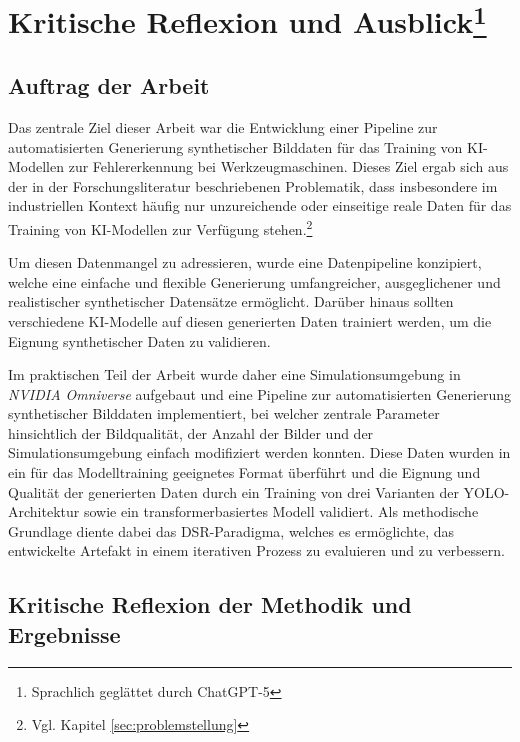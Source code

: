 \chapter[Kritische Reflexion und Ausblick]{Kritische Reflexion und Ausblick\footnote{Sprachlich geglättet durch ChatGPT-5}}
\label{chapter:Ergebnisdiskussion}

\section{Auftrag der Arbeit}
Das zentrale Ziel dieser Arbeit war die Entwicklung einer Pipeline zur automatisierten Generierung synthetischer Bilddaten für das Training von \ac{KI}-Modellen zur Fehlererkennung bei Werkzeugmaschinen. Dieses Ziel ergab sich aus der in der Forschungsliteratur beschriebenen Problematik, dass insbesondere im industriellen Kontext häufig nur unzureichende oder einseitige reale Daten für das Training von \ac{KI}-Modellen zur Verfügung stehen.\footnote{Vgl. Kapitel \ref{sec:problemstellung}}

Um diesen Datenmangel zu adressieren, wurde eine Datenpipeline konzipiert, welche eine einfache und flexible Generierung umfangreicher, ausgeglichener und realistischer synthetischer Datensätze ermöglicht. Darüber hinaus sollten verschiedene \ac{KI}-Modelle auf diesen generierten Daten trainiert werden, um die Eignung synthetischer Daten zu validieren.

Im praktischen Teil der Arbeit wurde daher eine Simulationsumgebung in \textit{NVIDIA Omniverse} aufgebaut und eine Pipeline zur automatisierten Generierung synthetischer Bilddaten implementiert, bei welcher zentrale Parameter hinsichtlich der Bildqualität, der Anzahl der Bilder und der Simulationsumgebung einfach modifiziert werden konnten. Diese Daten wurden in ein für das Modelltraining geeignetes Format überführt und die Eignung und Qualität der generierten Daten durch ein Training von drei Varianten der \ac{YOLO}-Architektur sowie ein transformerbasiertes Modell validiert. Als methodische Grundlage diente dabei das \ac{DSR}-Paradigma, welches es ermöglichte, das entwickelte Artefakt in einem iterativen Prozess zu evaluieren und zu verbessern.


\section{Kritische Reflexion der Methodik und Ergebnisse}

